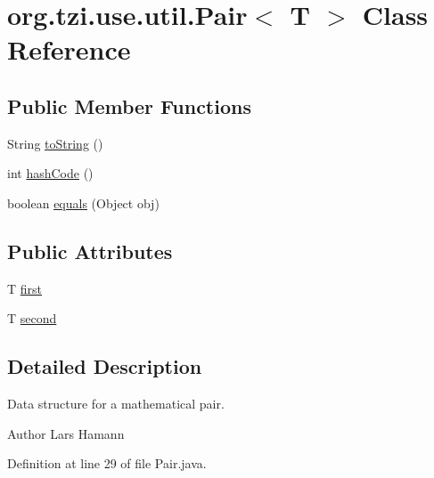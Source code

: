 \hypertarget{classorg_1_1tzi_1_1use_1_1util_1_1_pair_3_01_t_01_4}{\section{org.\-tzi.\-use.\-util.\-Pair$<$ T $>$ Class Reference}
\label{classorg_1_1tzi_1_1use_1_1util_1_1_pair_3_01_t_01_4}
}
\subsection*{Public Member Functions}
\begin{DoxyCompactItemize}
\item 
String \hyperlink{classorg_1_1tzi_1_1use_1_1util_1_1_pair_3_01_t_01_4_abe2ee0996d353a01d669db7f9fc455a6}{to\-String} ()
\item 
int \hyperlink{classorg_1_1tzi_1_1use_1_1util_1_1_pair_3_01_t_01_4_a0e917330ed22faf3b8e9feb6fdb3cdfc}{hash\-Code} ()
\item 
boolean \hyperlink{classorg_1_1tzi_1_1use_1_1util_1_1_pair_3_01_t_01_4_a470fb3f5254a36ed1adab8c2c9ce60b6}{equals} (Object obj)
\end{DoxyCompactItemize}
\subsection*{Public Attributes}
\begin{DoxyCompactItemize}
\item 
T \hyperlink{classorg_1_1tzi_1_1use_1_1util_1_1_pair_3_01_t_01_4_a6d2b6e30ccf375f314855b7eae2cd0ac}{first}
\item 
T \hyperlink{classorg_1_1tzi_1_1use_1_1util_1_1_pair_3_01_t_01_4_a9eccd9177d0d30dd9165a26e8e6e7858}{second}
\end{DoxyCompactItemize}


\subsection{Detailed Description}
Data structure for a mathematical pair. \begin{DoxyAuthor}{Author}
Lars Hamann 
\end{DoxyAuthor}


Definition at line 29 of file Pair.\-java.



